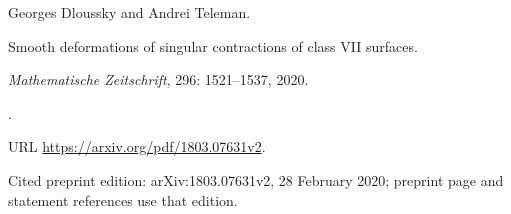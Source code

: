 Georges Dloussky and Andrei Teleman.

\newblock Smooth deformations of singular contractions of class {VII} surfaces.

\newblock \emph{Mathematische Zeitschrift}, 296: 1521--1537, 2020.

\newblock {}.

\newblock URL \url{https://arxiv.org/pdf/1803.07631v2}.

\newblock Cited preprint edition: arXiv:1803.07631v2, 28 February 2020; preprint page and statement references use that edition.

